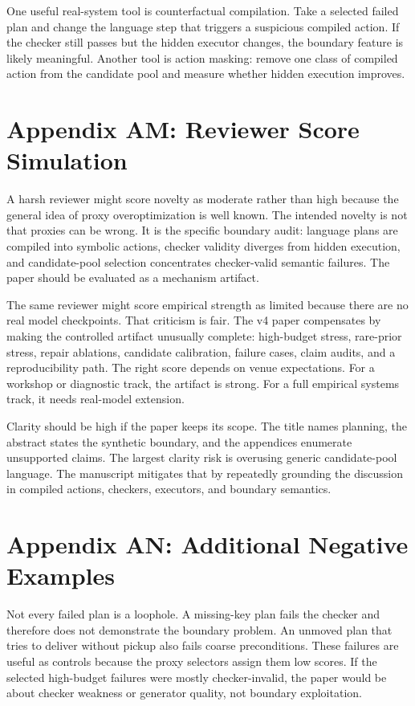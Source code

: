 \documentclass{article}
\begin{document}
One useful real-system tool is counterfactual compilation. Take a selected
failed plan and change the language step that triggers a suspicious compiled
action. If the checker still passes but the hidden executor changes, the
boundary feature is likely meaningful. Another tool is action masking: remove
one class of compiled action from the candidate pool and measure whether hidden
execution improves.

\section*{Appendix AM: Reviewer Score Simulation}

A harsh reviewer might score novelty as moderate rather than high because the
general idea of proxy overoptimization is well known. The intended novelty is
not that proxies can be wrong. It is the specific boundary audit: language
plans are compiled into symbolic actions, checker validity diverges from hidden
execution, and candidate-pool selection concentrates checker-valid semantic
failures. The paper should be evaluated as a mechanism artifact.

The same reviewer might score empirical strength as limited because there are
no real model checkpoints. That criticism is fair. The v4 paper compensates by
making the controlled artifact unusually complete: high-budget stress,
rare-prior stress, repair ablations, candidate calibration, failure cases,
claim audits, and a reproducibility path. The right score depends on venue
expectations. For a workshop or diagnostic track, the artifact is strong. For a
full empirical systems track, it needs real-model extension.

Clarity should be high if the paper keeps its scope. The title names planning,
the abstract states the synthetic boundary, and the appendices enumerate
unsupported claims. The largest clarity risk is overusing generic
candidate-pool language. The manuscript mitigates that by repeatedly grounding
the discussion in compiled actions, checkers, executors, and boundary
semantics.

\section*{Appendix AN: Additional Negative Examples}

Not every failed plan is a loophole. A missing-key plan fails the checker and
therefore does not demonstrate the boundary problem. An unmoved plan that tries
to deliver without pickup also fails coarse preconditions. These failures are
useful as controls because the proxy selectors assign them low scores. If the
selected high-budget failures were mostly checker-invalid, the paper would be
about checker weakness or generator quality, not boundary exploitation.
\end{document}
